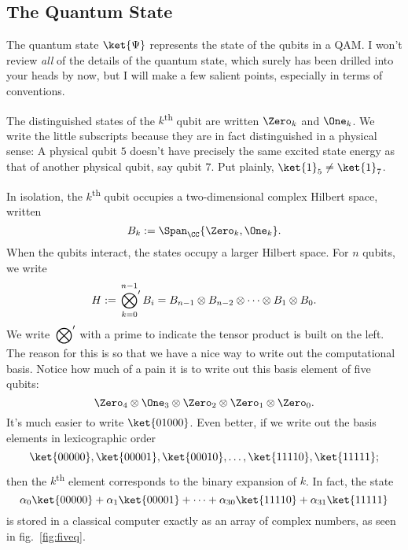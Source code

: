 \subsection{The Quantum State}
The quantum state $\ket{\Psi}$ represents the state of the qubits in a QAM. I won't review \emph{all} of the details of the quantum state, which surely has been drilled into your heads by now, but I will make a few salient points, especially in terms of conventions.

The distinguished states of the $k$\textsuperscript{th} qubit are written $\Zero_k$ and $\One_k$. We write the little subscripts because they are in fact distinguished in a physical sense: A physical qubit $5$ doesn't have precisely the same excited state energy as that of another physical qubit, say qubit $7$. Put plainly, $\ket{1}_5\neq\ket{1}_7$.

In isolation, the $k$\textsuperscript{th} qubit occupies a two-dimensional complex Hilbert space, written 
\begin{equation*}
    B_k := \Span_{\CC}\{\Zero_k,\One_k\}.
\end{equation*}
When the qubits interact, the states occupy a larger Hilbert space. For $n$ qubits, we write
\begin{equation*}
    H := \sideset{}{'}\bigotimes_{k=0}^{n-1} B_i = B_{n-1} \otimes B_{n-2} \otimes \cdots \otimes B_1 \otimes B_0.
\end{equation*}
We write $\sideset{}{'}\bigotimes$ with a prime to indicate the tensor product is built on the left. The reason for this is so that we have a nice way to write out the computational basis. Notice how much of a pain it is to write out this basis element of five qubits:
\begin{displaymath}
\Zero_4 \otimes \One_3 \otimes \Zero_2 \otimes \Zero_1 \otimes \Zero_0.
\end{displaymath}
It's much easier to write $\ket{01000}$. Even better, if we write out the basis elements in lexicographic order
\begin{displaymath}
\ket{00000}, \ket{00001}, \ket{00010}, \ldots, \ket{11110}, \ket{11111};
\end{displaymath}
then the $k$\textsuperscript{th} element corresponds to the binary expansion of $k$. In fact, the state
\begin{displaymath}
\alpha_0\ket{00000} + \alpha_1\ket{00001} + \cdots + \alpha_{30}\ket{11110} + \alpha_{31}\ket{11111}
\end{displaymath}
is stored in a classical computer exactly as an array of complex numbers, as seen in fig.~\ref{fig:fiveq}.

